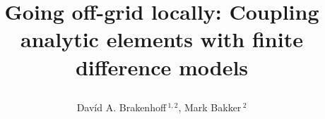 \tikzposterlatexaffectionproofoff

\title{\parbox{\linewidth}{\centering Going off-grid locally: Coupling analytic elements with finite difference models}}
\author{Davíd A. Brakenhoff$\,^{1,2}$, Mark Bakker$\,^2$}


\newcommand{\colorBlockTitleText}{FFFFFF}   %




